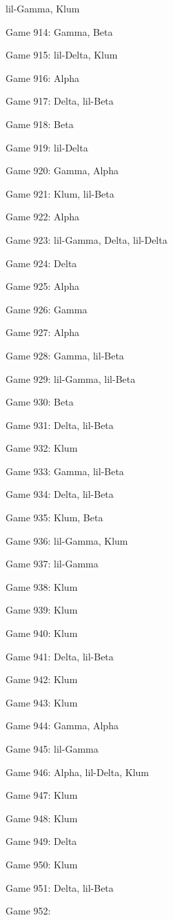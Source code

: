\documentclass{article}
\begin{document}
\begin{multicols}{3}
\begin{compactitem}
lil-Gamma, Klum
\item Game 914:
Gamma, Beta
\item Game 915:
lil-Delta, Klum
\item Game 916:
Alpha
\item Game 917:
Delta, lil-Beta
\item Game 918:
Beta
\item Game 919:
lil-Delta
\item Game 920:
Gamma, Alpha
\item Game 921:
Klum, lil-Beta
\item Game 922:
Alpha
\item Game 923:
lil-Gamma, Delta, lil-Delta
\item Game 924:
Delta
\item Game 925:
Alpha
\item Game 926:
Gamma
\item Game 927:
Alpha
\item Game 928:
Gamma, lil-Beta
\item Game 929:
lil-Gamma, lil-Beta
\item Game 930:
Beta
\item Game 931:
Delta, lil-Beta
\item Game 932:
Klum
\item Game 933:
Gamma, lil-Beta
\item Game 934:
Delta, lil-Beta
\item Game 935:
Klum, Beta
\item Game 936:
lil-Gamma, Klum
\item Game 937:
lil-Gamma
\item Game 938:
Klum
\item Game 939:
Klum
\item Game 940:
Klum
\item Game 941:
Delta, lil-Beta
\item Game 942:
Klum
\item Game 943:
Klum
\item Game 944:
Gamma, Alpha
\item Game 945:
lil-Gamma
\item Game 946:
Alpha, lil-Delta, Klum
\item Game 947:
Klum
\item Game 948:
Klum
\item Game 949:
Delta
\item Game 950:
Klum
\item Game 951:
Delta, lil-Beta
\item Game 952:

\end{compactitem}
\end{multicols}
\end{document}
